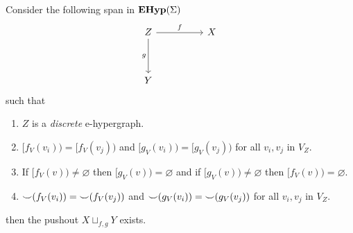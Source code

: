 \begin{thm}
	\label{th:existence_of_pushouts}
	Consider the following span in $\mathbf{EHyp}(\Sigma)$
	\[\begin{tikzcd}
			Z && X \\
			\\
			Y
			\arrow["f", from=1-1, to=1-3]
			\arrow["g"', from=1-1, to=3-1]
		\end{tikzcd}\]
	such that
	\begin{enumerate}
		\label{pushout:assumptions}
		\item $Z$ is a \textit{discrete} e-hypergraph.
		\item \label{assumption:equal_predecessors} $[f_{V}(v_i)) = [f_{V}(v_j))$ and $[g_{V}(v_i)) = [g_{V}(v_j))$ for all $v_{i},v_{j}$ in $V_{Z}$.
		\item \label{assumption:non_ambiguous_predecessors} If $[f_{V}(v)) \not = \varnothing$ then $[g_{V}(v)) = \varnothing$ and if $[g_{V}(v)) \not = \varnothing$ then $[f_{V}(v)) = \varnothing$.
		\item ${\smile}(f_{V}(v_i)) = {\smile}(f_{V}(v_j))$ and ${\smile}(g_{V}(v_i)) = {\smile}(g_{V}(v_j))$ for all $v_i,v_j$ in $V_{Z}$.
	\end{enumerate}
	then the pushout $X \sqcup _{f,g} Y$ exists.
\end{thm}
